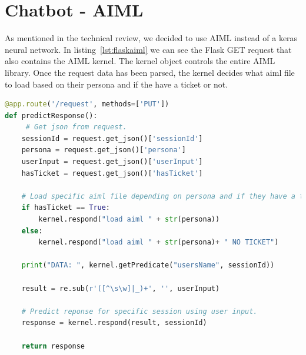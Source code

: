 \section{Chatbot - AIML}
As mentioned in the technical review, we decided to use AIML instead of a keras neural network. In listing~\ref{lst:flaskaiml} we can see the Flask GET request that also contains the AIML kernel. The kernel object controls the entire AIML library. Once the request data has been parsed, the kernel decides what aiml file to load based on their persona and if the have a ticket or not.

\begin{lstlisting}[caption={Generate AIML response},label={lst:flaskaiml},language=python]
@app.route('/request', methods=['PUT'])
def predictResponse():
     # Get json from request.
    sessionId = request.get_json()['sessionId']
    persona = request.get_json()['persona']
    userInput = request.get_json()['userInput']
    hasTicket = request.get_json()['hasTicket']

    # Load specific aiml file depending on persona and if they have a ticket.
    if hasTicket == True:
        kernel.respond("load aiml " + str(persona))
    else:
        kernel.respond("load aiml " + str(persona)+ " NO TICKET")
        
    print("DATA: ", kernel.getPredicate("usersName", sessionId))

    result = re.sub(r'([^\s\w]|_)+', '', userInput)

    # Predict reponse for specific session using user input.
    response = kernel.respond(result, sessionId)

    return response
\end{lstlisting}

